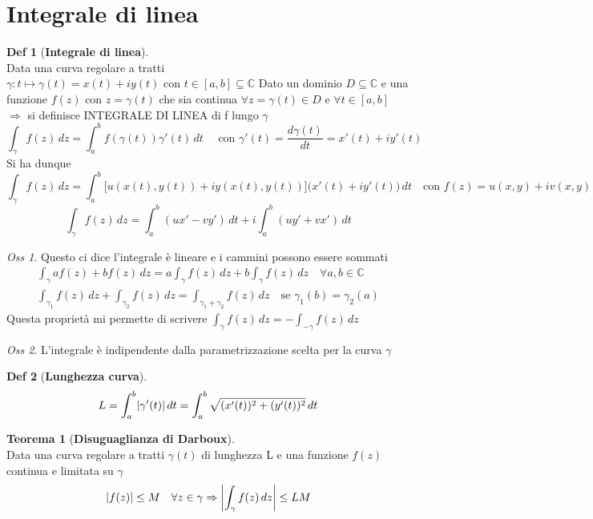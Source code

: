 \documentclass[a4paper,11pt]{report}
\theoremstyle{remark}
\newtheorem*{oss}{Oss}
\theoremstyle{definition}
\newtheorem*{teo}{Teorema}
\newtheorem*{Def}{Def}
\DeclarePairedDelimiter{\abs}{\lvert}{\rvert}
\begin{document}
	\section{Integrale di linea}
	\begin{Def}[\textbf{Integrale di linea}]\hfil\\
		Data una curva regolare a tratti $\gamma: t\mapsto\gamma(t)=x(t)+iy(t) \text{ con } t \in [a,b]\subseteq\mathbb{C}$ \newline
		Dato un dominio $D\subseteq\mathbb{C}$ e una funzione $f(z) \mbox{ con } z=\gamma(t)$ che sia continua $\forall z=\gamma(t)\in D \mbox{ e } \forall t \in [a,b]$ $\Rightarrow$ si definisce INTEGRALE DI LINEA di f lungo $\gamma$
		\begin{equation*}
		\int_\gamma f(z)\,dz = \int_{a}^{b} f(\gamma(t))\gamma'(t)\,dt \quad \mbox{ con }\gamma'(t) = \frac{d\gamma(t)}{dt} = x'(t)+iy'(t)
		\end{equation*}
		Si ha dunque 
		\begin{equation*}
			\int_\gamma f(z)\,dz = \int_{a}^{b} \bigl[u(x(t),y(t)) + iy(x(t),y(t))\bigr]\bigl(x'(t)+iy'(t)\bigr)\,dt \quad \text{con } f(z)= u(x,y)+iv(x,y)
		\end{equation*}
		\begin{equation*}
		\int_\gamma f(z)\,dz = \int_{a}^{b} (ux'-vy')\,dt + i\int_{a}^{b} (uy'+vx')\,dt
		\end{equation*}
	\end{Def}
	\begin{oss}
		Questo ci dice l'integrale è lineare e i cammini possono essere sommati
		\begin{gather*}
			\int_\gamma af(z)+bf(z)\,dz = a\int_\gamma f(z)\,dz + b\int_\gamma f(z)\,dz \quad \forall a,b \in \mathbb{C} \\
			\int_{\gamma_1} f(z)\,dz + \int_{\gamma_2} f(z)\,dz = \int_{\gamma_1+\gamma_2} f(z)\,dz \quad \mbox{se } \gamma_1(b)=\gamma_2(a)
		\end{gather*}
		Questa proprietà mi permette di scrivere $	\int_\gamma f(z)\,dz= -\int_{-\gamma} f(z)\,dz$
	\end{oss}
	\begin{oss}
		L'integrale è indipendente dalla parametrizzazione scelta per la curva $\gamma$
	\end{oss}
	\begin{Def}[\textbf{Lunghezza curva}]
		\begin{equation*}
			L=\int_{a}^{b} \abs{\gamma'(t)}\,dt = \int_{a}^{b} \sqrt{(x'(t))^2+(y'(t))^2}\,dt
		\end{equation*}
	\end{Def} 
	\begin{teo}[\textbf{Disuguaglianza di Darboux}]\hfil\\
		Data una curva regolare a tratti $\gamma(t)$ di lunghezza L e una funzione $f(z)$ continua e limitata su $\gamma$
		\begin{equation}
			\abs{f(z)}\le M \quad \forall z \in \gamma \Rightarrow \abs*{\int_\gamma f(z)\,dz}\le LM
		\end{equation}
	\end{teo}
\end{document}
